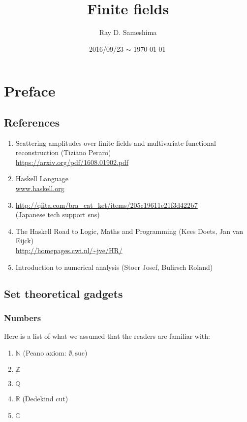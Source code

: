 \documentclass[11pt]{book}
\begin{document}
\newcommand{\Slash}[1]{{\ooalign{\hfil/\crcr$#1$}}}

\title{Finite fields}
\author{Ray D. Sameshima}
\date{2016/09/23 $\sim$ \today \, \currenttime}
\maketitle

\tableofcontents

\setcounter{chapter}{-1}
\chapter{Preface}
\section{References}
\begin{enumerate}
\item \label{Tiziano}
Scattering amplitudes over finite fields and multivariate functional reconstruction (Tiziano Peraro)\\
\url{https://arxiv.org/pdf/1608.01902.pdf}

\item Haskell Language \\
\url{www.haskell.org}

\item \url{http://qiita.com/bra_cat_ket/items/205c19611e21f3d422b7}\\
(Japanese tech support sns)

\item \label{Haskellroad}
The Haskell Road to Logic, Maths and Programming (Kees Doets, Jan van Eijck)\\
\url{http://homepages.cwi.nl/~jve/HR/}

\item \label{Numerical}
Introduction to numerical analysis (Stoer Josef, Bulirsch Roland)

\end{enumerate}

\section{Set theoretical gadgets}
\subsection{Numbers}
Here is a list of what we assumed that the readers are familiar with:
\begin{enumerate}
\item $\mathbb{N}$ (Peano axiom: $\emptyset, \text{suc}$)
\item $\mathbb{Z}$
\item $\mathbb{Q}$
\item $\mathbb{R}$ (Dedekind cut)
\item $\mathbb{C}$ 
\end{enumerate}
\end{document}

